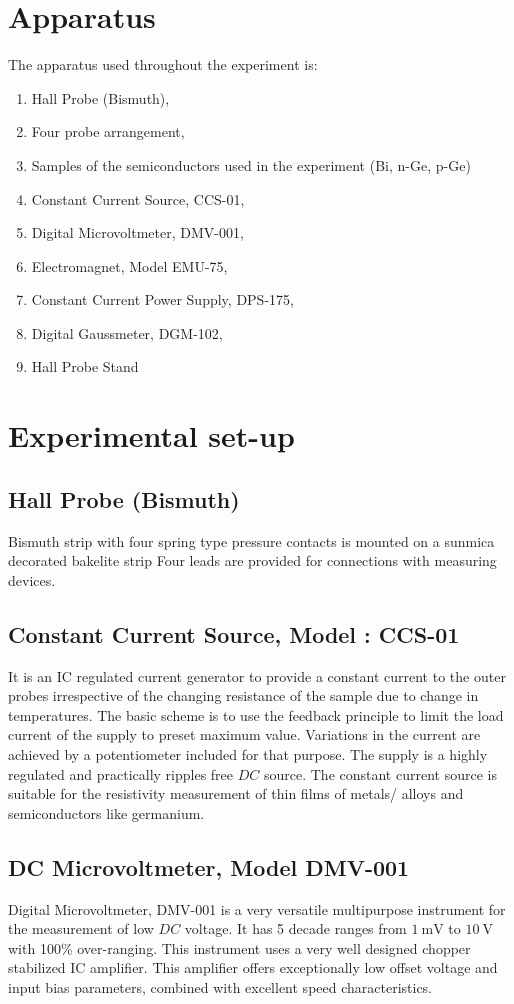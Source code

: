 \documentclass[%
 aip,
 amsmath,amssymb,
 reprint,%
]{revtex4-1}
\begin{document}
\section{Apparatus}
    The apparatus used throughout the experiment is:
    \begin{enumerate}
        \item Hall Probe (Bismuth),
        \item Four probe arrangement,
        \item Samples of the semiconductors used in the experiment (Bi, n-Ge, p-Ge)
        \item Constant Current Source, CCS-01,
        \item Digital Microvoltmeter, DMV-001,
        \item Electromagnet, Model EMU-75,
        \item Constant Current Power Supply, DPS-175, 
        \item Digital Gaussmeter, DGM-102, 
        \item Hall Probe Stand
    \end{enumerate}


\section{Experimental set-up}
    \subsection{Hall Probe (Bismuth)}
    Bismuth strip with four spring type pressure contacts is mounted on a sunmica decorated bakelite strip Four leads are provided for connections with measuring devices.
    \subsection{Constant Current Source, Model : CCS-01}
    It is an IC regulated current generator to provide a constant current to the outer probes irrespective of the changing resistance of the sample due to change in temperatures. The basic scheme is to use the feedback principle to limit the load current of the supply to preset maximum value. Variations in the current are achieved by a potentiometer included for that purpose. The supply is a highly regulated and practically ripples free $DC$ source. The constant current source is suitable for the resistivity measurement of thin films of metals/ alloys and semiconductors like germanium.
    \subsection{DC Microvoltmeter, Model DMV-001}
    Digital Microvoltmeter, DMV-001 is a very versatile multipurpose instrument
    for the measurement of low $DC$ voltage. It has 5 decade ranges from $\SI{1}{\milli \volt}$ to $\SI{10}{\volt}$ with
    100\% over-ranging. This instrument uses a very well designed chopper stabilized IC amplifier.
    This amplifier offers exceptionally low offset voltage and input bias parameters, combined with excellent speed characteristics.
\end{document}
